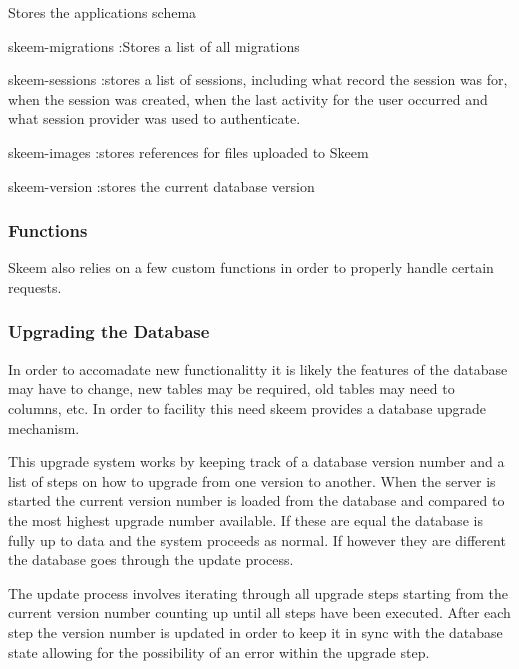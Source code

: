 \documentclass[
  12pt,
]{article}
\providecommand{\tightlist}{%
  \setlength{\itemsep}{0pt}\setlength{\parskip}{0pt}}
\begin{document}
\begin{description}
\tightlist
\item[skeem-schema]
Stores the applications schema
\end{description}

skeem-migrations :Stores a list of all migrations

skeem-sessions :stores a list of sessions, including what record the
session was for, when the session was created, when the last activity
for the user occurred and what session provider was used to
authenticate.

skeem-images :stores references for files uploaded to Skeem

skeem-version :stores the current database version

\hypertarget{functions}{%
\subsubsection{Functions}\label{functions}}

Skeem also relies on a few custom functions in order to properly handle
certain requests.

\hypertarget{upgrading-the-database}{%
\subsubsection{Upgrading the Database}\label{upgrading-the-database}}

In order to accomadate new functionalitty it is likely the features of
the database may have to change, new tables may be required, old tables
may need to columns, etc. In order to facility this need skeem provides
a database upgrade mechanism.

This upgrade system works by keeping track of a database version number
and a list of steps on how to upgrade from one version to another. When
the server is started the current version number is loaded from the
database and compared to the most highest upgrade number available. If
these are equal the database is fully up to data and the system proceeds
as normal. If however they are different the database goes through the
update process.

The update process involves iterating through all upgrade steps starting
from the current version number counting up until all steps have been
executed. After each step the version number is updated in order to keep
it in sync with the database state allowing for the possibility of an
error within the upgrade step.
\end{document}
